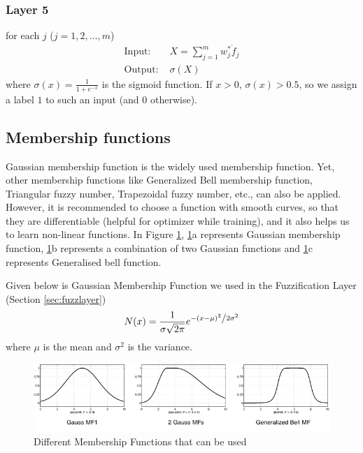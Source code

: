 \documentclass[11pt,a4paper]{article}
\begin{document}
\subsubsection{Layer 5}
for each $j$ ($j = 1,2, \dots ,m$)
\begin{align}
    \text{Input: } & X = \sum_{j=1}^{m} w^*_j\dot f_j \\
    \text{Output: } & \sigma({X})
\end{align}
where $\sigma (x) = \frac{1}{1+e^{-x}}$ is the sigmoid function. If $x>0$, $\sigma(x)>0.5$, so we assign a label $1$ to such an input (and $0$ otherwise).


\subsection{Membership functions}
\label{sec:mf}
Gaussian membership function is the widely used membership function. Yet, other membership functions like Generalized Bell membership function, Triangular fuzzy number, Trapezoidal fuzzy number, etc., can also be applied. However, it is recommended to choose a function with smooth curves, so that they are differentiable (helpful for optimizer while training), and it also helps us to learn non-linear functions. In Figure \ref{fig:gmf1}, \ref{fig:gmf1}a represents Gaussian membership function, \ref{fig:gmf1}b represents a combination of two Gaussian functions and \ref{fig:gmf1}c represents Generalised bell function.

Given below is Gaussian Membership Function we used in the Fuzzification Layer (Section \ref{sec:fuzzlayer})\\

\begin{align}\label{formula:gmf}
    N(x) = \frac{1}{{\sigma \sqrt {2\pi } }}e^{{{ - \left( {x - \mu } \right)^2 } \mathord{\left/ {\vphantom {{ - \left( {x - \mu } \right)^2 } {2\sigma ^2 }}} \right. \kern-\nulldelimiterspace} {2\sigma ^2 }}}
\end{align}
where $\mu$ is the mean and $\sigma ^2$ is the variance.


\begin{figure}[htbp]
\includegraphics[width=2\columnwidth]{gbellandgaussmfs.png}
\caption{\label{fig:gmf1} Different Membership Functions that can be used}
\end{figure}
\end{document}
